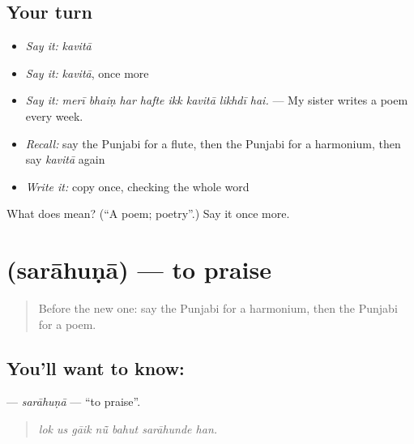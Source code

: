\subsection*{Your turn}
\begin{itemize}
\raggedright
  \item \emph{Say it:} \emph{kavitā}
  \item \emph{Say it:} \emph{kavitā}, once more
  \item \emph{Say it:} \emph{merī bhaiṇ har hafte ikk kavitā likhdī hai.} — My sister writes a poem every week.
  \item \emph{Recall:} say the Punjabi for a flute, then the Punjabi for a harmonium, then say \emph{kavitā} again
  \item \emph{Write it:} copy \textbf{} once, checking the whole word
\end{itemize}

\begin{tcolorbox}[breakable,colback=teal!4,colframe=teal!35!black,title={Before you move on}]
What does  mean? (\textquotedblleft{}A poem; poetry\textquotedblright{}.) Say it once more.
\end{tcolorbox}
\section[\texorpdfstring{\pa{ਸਰਾਹੁਣਾ} (sarāhuṇā)}{ਸਰਾਹੁਣਾ (sarāhuṇā)}]{ (sarāhuṇā) — to praise}

\label{lesson:PA-C349-sarahuna}



\begin{quote}
Before the new one: say the Punjabi for a harmonium, then the Punjabi for a poem.
\end{quote}

\subsection*{You'll want to know: }
\textbf{} — \emph{sarāhuṇā} — \textquotedblleft{}to praise\textquotedblright{}.

\begin{quote}
      
\end{quote}

\begin{quote}
\emph{lok us gāik nū̃ bahut sarāhunde han.}
\end{quote}

